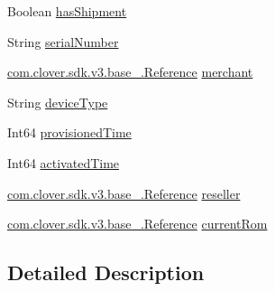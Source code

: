 \begin{DoxyCompactItemize}
\item 
Boolean \hyperlink{classcom_1_1clover_1_1sdk_1_1v3_1_1device_1_1_device_provision_af00e2d8ac6db434cdd7ac8877160ea96}{has\+Shipment}
\item 
String \hyperlink{classcom_1_1clover_1_1sdk_1_1v3_1_1device_1_1_device_provision_ab5f83945f67778103595c9a69e2f1dfb}{serial\+Number}
\item 
\hyperlink{classcom_1_1clover_1_1sdk_1_1v3_1_1base___1_1_reference}{com.\+clover.\+sdk.\+v3.\+base\+\_\+.\+Reference} \hyperlink{classcom_1_1clover_1_1sdk_1_1v3_1_1device_1_1_device_provision_a9dfee6aa002319165d570115c4ff3294}{merchant}
\item 
String \hyperlink{classcom_1_1clover_1_1sdk_1_1v3_1_1device_1_1_device_provision_a4d058b79c0e212a7e5e53427611eed24}{device\+Type}
\item 
Int64 \hyperlink{classcom_1_1clover_1_1sdk_1_1v3_1_1device_1_1_device_provision_aeb6104c74a82fa7970232e4553c4eaf5}{provisioned\+Time}
\item 
Int64 \hyperlink{classcom_1_1clover_1_1sdk_1_1v3_1_1device_1_1_device_provision_a0d4bf5111906b2d5294f3996f0d7738c}{activated\+Time}
\item 
\hyperlink{classcom_1_1clover_1_1sdk_1_1v3_1_1base___1_1_reference}{com.\+clover.\+sdk.\+v3.\+base\+\_\+.\+Reference} \hyperlink{classcom_1_1clover_1_1sdk_1_1v3_1_1device_1_1_device_provision_a06ef63395e9dd9c57461fbd4fcb36a30}{reseller}
\item 
\hyperlink{classcom_1_1clover_1_1sdk_1_1v3_1_1base___1_1_reference}{com.\+clover.\+sdk.\+v3.\+base\+\_\+.\+Reference} \hyperlink{classcom_1_1clover_1_1sdk_1_1v3_1_1device_1_1_device_provision_ac057ac577e880965c7c3a844b1551939}{current\+Rom}
\end{DoxyCompactItemize}


\subsection{Detailed Description}


